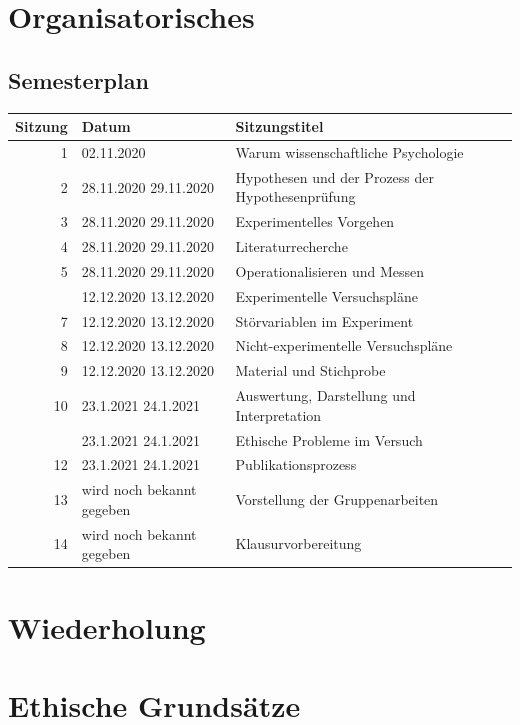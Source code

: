 \documentclass[
]{book}
\begin{document}
\hypertarget{organisatorisches-10}{%
\section{Organisatorisches}\label{organisatorisches-10}}

\hypertarget{semesterplan-11}{%
\subsection{Semesterplan}\label{semesterplan-11}}

\begin{tabular}[t]{rll}
\toprule
Sitzung & Datum & Sitzungstitel\\
\midrule
1 & 02.11.2020 & Warum wissenschaftliche Psychologie\\
2 & 28.11.2020
29.11.2020 & Hypothesen und der Prozess der Hypothesenprüfung\\
3 & 28.11.2020
29.11.2020 & Experimentelles Vorgehen\\
4 & 28.11.2020
29.11.2020 & Literaturrecherche\\
5 & 28.11.2020
29.11.2020 & Operationalisieren und Messen\\
\addlinespace
6 & 12.12.2020
13.12.2020 & Experimentelle Versuchspläne\\
7 & 12.12.2020
13.12.2020 & Störvariablen im Experiment\\
8 & 12.12.2020
13.12.2020 & Nicht-experimentelle Versuchspläne\\
9 & 12.12.2020
13.12.2020 & Material und Stichprobe\\
10 & 23.1.2021
24.1.2021 & Auswertung, Darstellung und Interpretation\\
\addlinespace
11 & 23.1.2021
24.1.2021 & Ethische Probleme im Versuch\\
12 & 23.1.2021
24.1.2021 & Publikationsprozess\\
13 & wird noch bekannt gegeben & Vorstellung der Gruppenarbeiten\\
14 & wird noch bekannt gegeben & Klausurvorbereitung\\
\bottomrule
\end{tabular}

\hypertarget{wiederholung-9}{%
\section{Wiederholung}\label{wiederholung-9}}

\hypertarget{ethische-grundsuxe4tze}{%
\section{Ethische Grundsätze}\label{ethische-grundsuxe4tze}}
\end{document}
